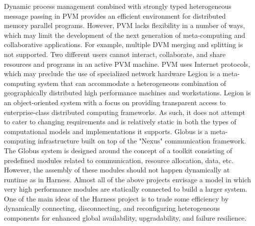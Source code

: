 \documentclass[a4paper,twoside]{scrbook}
\begin{document}
Dynamic process management combined with strongly typed heterogeneous message passing in PVM provides an efficient environment for distributed memory parallel programs. However, PVM lacks flexibility in a number of ways, which may limit the development of the next generation of meta-computing and collaborative applications. For example, multiple DVM merging and splitting is not supported. Two different users cannot interact, collaborate, and share resources and programs in an active PVM machine. PVM uses Internet protocols, which may preclude the use of specialized network hardware
Legion is a meta-computing system that can accommodate a heterogeneous combination of geographically distributed high performance machines and workstations. Legion is an object-oriented system with a focus on providing transparent access to enterprise-class distributed computing frameworks. As such, it does not attempt to cater to changing requirements and is relatively static in both the types of computational models and implementations it supports.
Globus is a meta-computing infrastructure built on top of the "Nexus" communication framework. The Globus system is designed around the concept of a toolkit consisting of predefined modules related to communication, resource allocation, data, etc. However, the assembly of these modules should not happen dynamically at runtime as in Harness.
Almost all of the above projects envisage a model in which very high performance modules are statically connected to build a larger system. One of the main ideas of the Harness project is to trade some efficiency by dynamically connecting, disconnecting, and reconfiguring heterogeneous components for enhanced global availability, upgradability, and failure resilience.
\end{document}
